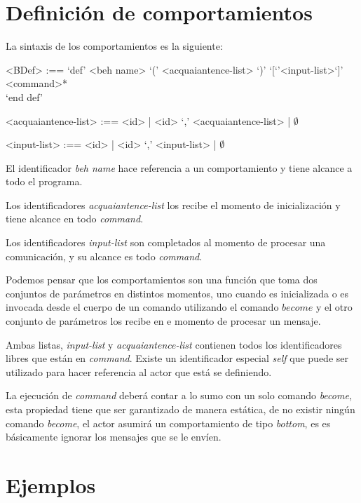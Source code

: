 \section{Definición de comportamientos}

La sintaxis de los comportamientos es la siguiente:

\begin{grammar}
<BDef> :== `def' <beh name> `(' <acquaiantence-list> `)' `[`'<input-list>`]' \\
\quad \quad <command>*  \\
\quad `end def'
  
<acquaiantence-list> :== <id> | <id> `,' <acquaiantence-list> | $\emptyset$ 
  
<input-list> :== <id> | <id> `,' <input-list> | $\emptyset$
\end{grammar}

El identificador \textit{beh name} hace referencia a un comportamiento y tiene alcance a todo el programa. 

Los identificadores \textit{acquaiantence-list} los recibe el
momento de inicialización y tiene alcance en todo \textit{command}. 

Los identificadores \textit{input-list} son completados al momento de procesar una comunicación, y su alcance es todo \textit{command}. 

Podemos pensar que los comportamientos son una función que toma dos conjuntos de parámetros en distintos momentos, uno cuando es inicializada o es invocada desde el cuerpo de un comando utilizando el comando $become$ y el otro conjunto de parámetros los recibe en e momento de procesar un mensaje.

Ambas listas, \textit{input-list} y \textit{acquaiantence-list} contienen todos los identificadores libres que están en \textit{command}. Existe un identificador especial \textit{self} que puede ser utilizado para hacer referencia al actor que está se definiendo. 

La ejecución de \textit{command} deberá contar a lo sumo con un solo comando \textit{become}, esta propiedad tiene que ser garantizado de manera estática, de no existir ningún comando \textit{become}, el actor asumirá un comportamiento de tipo \textit{bottom}, es es básicamente ignorar los mensajes que se le envíen.

\section{Ejemplos}

